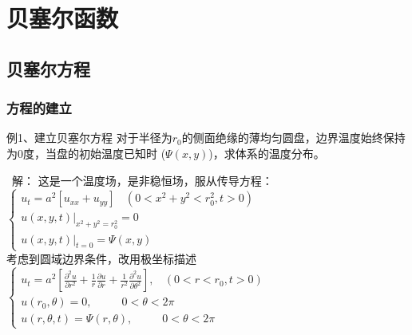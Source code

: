 \section{贝塞尔函数}

\subsection{贝塞尔方程}

\begin{frame}
	\frametitle{方程的建立}
	\begin{exampleblock} {例1、建立贝塞尔方程}
		对于半径为$r_0$的侧面绝缘的薄均匀圆盘，边界温度始终保持为0度，当盘的初始温度已知时 ($\Psi(x,y)$)，求体系的温度分布。
    \end{exampleblock}
	\begin{center}
	\end{center}
\end{frame}	

\begin{frame}
	\alert{ 解：}	这是一个温度场，是非稳恒场，服从传导方程：\\
	$\begin{cases}
		u_t=a^2 [u_{xx}   +u_{yy}] ~~~~ (0< x^2 +y^2 <r_0 ^2, t>0)\\
		u(x,y,t)|_{x^2+y^2=r_0 ^2}= 0 \\
		u(x,y,t)|_{t=0}= \Psi(x,y)
	\end{cases} $\\	
	考虑到圆域边界条件，改用极坐标描述\\
	$\begin{cases}
		\displaystyle	u_t=a^2 [ {	\frac{\partial^2 u }{\partial r^2 } +\frac{1}{r } \frac{\partial u }{\partial r } +
		\frac{1}{r^2 } \frac{\partial ^2 u }{\partial \theta ^2
		} }], ~~~~ (0<r<r_0, t>0)\\
		u(r_0,\theta)=0,~~~~~~~~~~~~ 0<\theta <2\pi 	\\
		u(r,\theta,t )=\Psi(r,\theta) ,~~~~~~~~~~~~ 0<\theta <2\pi 	
	\end{cases} $\\
\end{frame}	


